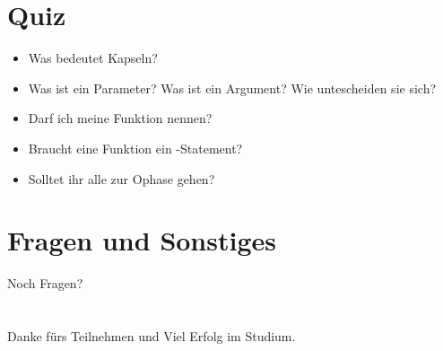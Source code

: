 \livecoding


\subsection{}

\section{Quiz}
\begin{frame}
    \slidehead
    \begin{itemize}
        \item Was bedeutet Kapseln?
            \pause
        \item Was ist ein Parameter?
            Was ist ein Argument?
            Wie untescheiden sie sich?
            \pause
        \item Darf ich meine Funktion  nennen?
            \pause
        \item Braucht eine Funktion ein -Statement?
            \pause
        \item Solltet ihr alle zur Ophase gehen?
    \end{itemize}
\end{frame}

\section{Fragen und Sonstiges}
\begin{frame}
    \slidehead
    \vspace{1.8cm}
    \centering
    \huge Noch Fragen?
\end{frame}

\section{}
\subsection{}

\begin{frame}
    \slidehead
    \vspace{1.8cm}
    \centering
    \huge Danke fürs Teilnehmen und Viel Erfolg im Studium.
\end{frame}


